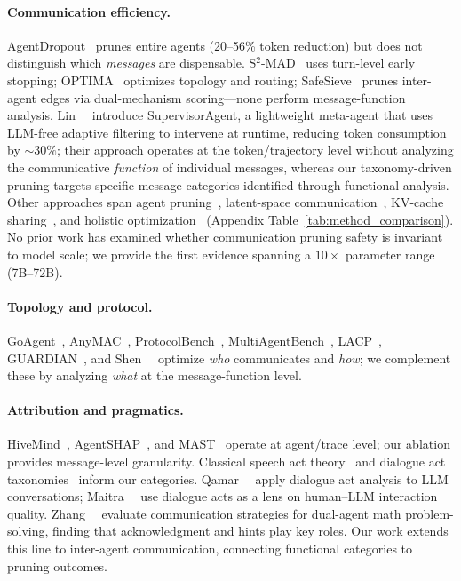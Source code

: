 \paragraph{Communication efficiency.}
AgentDropout~\cite{wang_agentdropout_2025, wang_agentdropout_v2_2026} prunes entire agents (20--56\% token reduction) but does not distinguish which \emph{messages} are dispensable. S$^2$-MAD~\cite{zeng_s2mad_2025} uses turn-level early stopping; OPTIMA~\cite{chen_optima_2025} optimizes topology and routing; SafeSieve~\cite{safesieve_2025} prunes inter-agent edges via dual-mechanism scoring---none perform message-function analysis. Lin~\etal~\cite{lin_supervisoragent_2026} introduce SupervisorAgent, a lightweight meta-agent that uses LLM-free adaptive filtering to intervene at runtime, reducing token consumption by ${\sim}30\%$; their approach operates at the token/trajectory level without analyzing the communicative \emph{function} of individual messages, whereas our taxonomy-driven pruning targets specific message categories identified through functional analysis. Other approaches span agent pruning~\cite{zhang_agentprune_2025, li_agp_2025, xiao_agentdiet_2026, wang_dagp_2025}, latent-space communication~\cite{zou_latentmas_2025, du_interlat_2025}, KV-cache sharing~\cite{ye_kvcomm_2025}, and holistic optimization~\cite{li_omac_2025, zhang_communication_strategies_2025, jiang_agentcomm_2026} (Appendix Table~\ref{tab:method_comparison}). No prior work has examined whether communication pruning safety is invariant to model scale; we provide the first evidence spanning a $10\times$ parameter range (7B--72B).

\paragraph{Topology and protocol.}
GoAgent~\cite{chen_goagent_2026}, AnyMAC~\cite{wang_anymac_2025}, ProtocolBench~\cite{du_protocolbench_2025}, MultiAgentBench~\cite{zhu_multiagentbench_2025}, LACP~\cite{li_lacp_2025}, GUARDIAN~\cite{zhou_guardian_2025}, and Shen~\etal~\cite{shen_topology_propagation_2025} optimize \emph{who} communicates and \emph{how}; we complement these by analyzing \emph{what} at the message-function level.

\paragraph{Attribution and pragmatics.}
HiveMind~\cite{xia_hivemind_2026}, AgentSHAP~\cite{horovicz_agentshap_2025}, and MAST~\cite{cemri_mast_2025} operate at agent/trace level; our ablation provides message-level granularity. Classical speech act theory~\cite{austin_how_1962, searle_speech_acts_1969} and dialogue act taxonomies~\cite{core_damsl_1997, bunt_iso_2012} inform our categories. Qamar~\etal~\cite{qamar_dialogue_acts_2025} apply dialogue act analysis to LLM conversations; Maitra~\etal~\cite{maitra_dialogue_lens_2025} use dialogue acts as a lens on human--LLM interaction quality. Zhang~\etal~\cite{zhang_communication_strategies_2025} evaluate communication strategies for dual-agent math problem-solving, finding that acknowledgment and hints play key roles. Our work extends this line to inter-agent communication, connecting functional categories to pruning outcomes.
